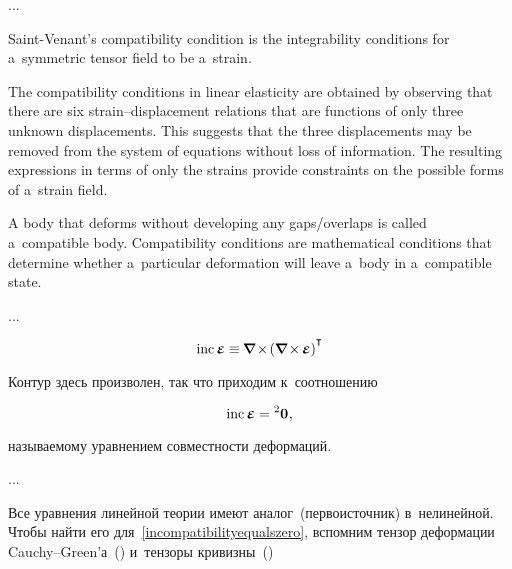 \begin{otherlanguage}{russian}
...

{\small
Saint\hbox{-\hspace{-0.2ex}}Venant’s compatibility condition is the integrability conditions for a~symmetric tensor field to be a~strain.

The compatibility conditions in linear elasticity are obtained by observing that there are six strain\hbox{--}displacement relations that are functions of only three unknown displacements. This suggests that the three displacements may be removed from the system of equations without loss of information. The resulting expressions in terms of only the strains provide constraints on the possible forms of a~strain field.

A body that deforms without developing any gaps/overlaps is called a~compatible body. Compatibility conditions are mathematical conditions that determine whether a~particular deformation will leave a~body in a~compatible state.
\par}

...

\begin{equation*}
\operatorname{inc} \mathboldepsilon \equiv
\hspace{-0.1ex} \boldnabla \hspace{-0.2ex} \times \hspace{-0.25ex} \left( \boldnabla \hspace{-0.2ex} \times \hspace{-0.16ex} \mathboldepsilon \right)^{\T}
\end{equation*}

Контур здесь произволен, так что приходим к~соотношению

\nopagebreak\vspace{-0.2em}\begin{equation}\label{incompatibilityequalszero}
\operatorname{inc} \mathboldepsilon = {^2\bm{0}} \hspace{.1ex} ,
\end{equation}

\vspace{-0.4em} \noindent называемому уравнением совместности деформаций.

...

Все уравнения линейной теории имеют аналог~(перво\-источ\-ник) в~нелинейной. Чтобы найти его для~\eqref{incompatibilityequalszero}, вспомним тензор деформации Cauchy\hbox{--}Green’а~() и~тензоры кривизны~()


\end{otherlanguage}

